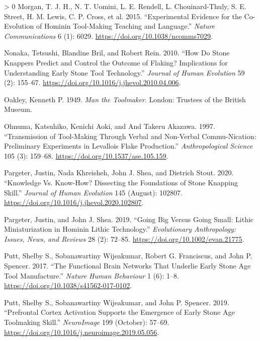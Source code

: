 \documentclass[smallextended]{svjour3}       %
\newlength{\cslhangindent}
\newenvironment{CSLReferences}[3] %
 {%
  \setlength{\parindent}{0pt}
  \ifodd #1 \everypar{\setlength{\hangindent}{\cslhangindent}}\ignorespaces\fi
  \ifnum #2 > 0
  \setlength{\parskip}{#3\baselineskip}
  \fi
 }%
 {}
\begin{document}
\begin{CSLReferences}{1}{0}
\leavevmode\hypertarget{ref-morgan2015}{}%
Morgan, T. J. H., N. T. Uomini, L. E. Rendell, L. Chouinard-Thuly, S. E.
Street, H. M. Lewis, C. P. Cross, et al. 2015. {``Experimental Evidence
for the Co-Evolution of Hominin Tool-Making Teaching and Language.''}
\emph{Nature Communications} 6 (1): 6029.
\url{https://doi.org/10.1038/ncomms7029}.

\leavevmode\hypertarget{ref-nonaka2010}{}%
Nonaka, Tetsushi, Blandine Bril, and Robert Rein. 2010. {``How Do Stone
Knappers Predict and Control the Outcome of Flaking? Implications for
Understanding Early Stone Tool Technology.''} \emph{Journal of Human
Evolution} 59 (2): 155--67.
\url{https://doi.org/10.1016/j.jhevol.2010.04.006}.

\leavevmode\hypertarget{ref-oakley1949}{}%
Oakley, Kenneth P. 1949. \emph{Man the Toolmaker}. London: Trustees of
the British Museum.

\leavevmode\hypertarget{ref-ohnuma1997}{}%
Ohnuma, Katsuhiko, Kenichi Aoki, and And Takeru Akazawa. 1997.
{``Transmission of Tool-Making Through Verbal and Non-Verbal
Commu-Nication: Preliminary Experiments in Levallois Flake
Production.''} \emph{Anthropological Science} 105 (3): 159--68.
\url{https://doi.org/10.1537/ase.105.159}.

\leavevmode\hypertarget{ref-pargeter2020}{}%
Pargeter, Justin, Nada Khreisheh, John J. Shea, and Dietrich Stout.
2020. {``Knowledge Vs. Know-How? Dissecting the Foundations of Stone
Knapping Skill.''} \emph{Journal of Human Evolution} 145 (August):
102807. \url{https://doi.org/10.1016/j.jhevol.2020.102807}.

\leavevmode\hypertarget{ref-pargeter2019}{}%
Pargeter, Justin, and John J. Shea. 2019. {``Going Big Versus Going
Small: Lithic Miniaturization in Hominin Lithic Technology.''}
\emph{Evolutionary Anthropology: Issues, News, and Reviews} 28 (2):
72--85. \url{https://doi.org/10.1002/evan.21775}.

\leavevmode\hypertarget{ref-putt2017}{}%
Putt, Shelby S., Sobanawartiny Wijeakumar, Robert G. Franciscus, and
John P. Spencer. 2017. {``The Functional Brain Networks That Underlie
Early Stone Age Tool Manufacture.''} \emph{Nature Human Behaviour} 1
(6): 1--8. \url{https://doi.org/10.1038/s41562-017-0102}.

\leavevmode\hypertarget{ref-putt2019}{}%
Putt, Shelby S., Sobanawartiny Wijeakumar, and John P. Spencer. 2019.
{``Prefrontal Cortex Activation Supports the Emergence of Early Stone
Age Toolmaking Skill.''} \emph{NeuroImage} 199 (October): 57--69.
\url{https://doi.org/10.1016/j.neuroimage.2019.05.056}.


\end{CSLReferences}
\end{document}
